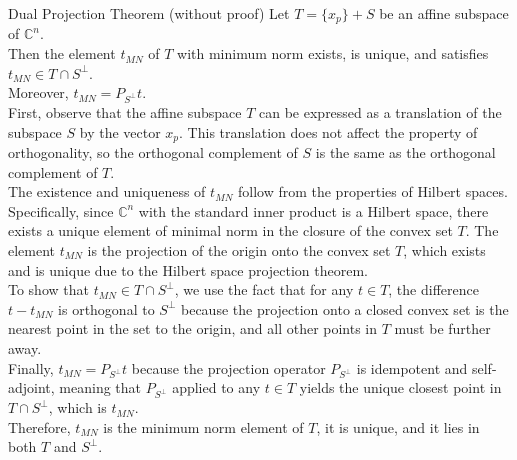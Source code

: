 \begin{theorembox}{Dual Projection Theorem (without proof)}
Let \( T = \{x_p\} + S \) be an affine subspace of \( \mathbb{C}^n \). \\

Then the element \( t_{MN} \) of \( T \) with minimum norm exists, is unique, and satisfies \( t_{MN} \in T \cap S^{\perp} \).\\

Moreover, \( t_{MN} = P_{S^{\perp}}t \).\\

First, observe that the affine subspace \( T \) can be expressed as a translation of the subspace \( S \) by the vector \( x_p \). This translation does not affect the property of orthogonality, so the orthogonal complement of \( S \) is the same as the orthogonal complement of \( T \).\\

The existence and uniqueness of \( t_{MN} \) follow from the properties of Hilbert spaces. Specifically, since \( \mathbb{C}^n \) with the standard inner product is a Hilbert space, there exists a unique element of minimal norm in the closure of the convex set \( T \). The element \( t_{MN} \) is the projection of the origin onto the convex set \( T \), which exists and is unique due to the Hilbert space projection theorem.\\

To show that \( t_{MN} \in T \cap S^{\perp} \), we use the fact that for any \( t \in T \), the difference \( t - t_{MN} \) is orthogonal to \( S^{\perp} \) because the projection onto a closed convex set is the nearest point in the set to the origin, and all other points in \( T \) must be further away.\\

Finally, \( t_{MN} = P_{S^{\perp}}t \) because the projection operator \( P_{S^{\perp}} \) is idempotent and self-adjoint, meaning that \( P_{S^{\perp}} \) applied to any \( t \in T \) yields the unique closest point in \( T \cap S^{\perp} \), which is \( t_{MN} \).\\

Therefore, \( t_{MN} \) is the minimum norm element of \( T \), it is unique, and it lies in both \( T \) and \( S^{\perp} \).
\\
\end{theorembox}

